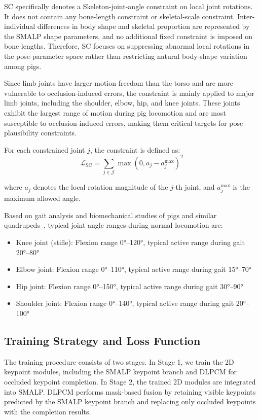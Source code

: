 \documentclass[runningheads]{llncs}
\begin{document}
SC specifically denotes a Skeleton-joint-angle constraint on local joint rotations. It does not contain any bone-length constraint or skeletal-scale constraint. Inter-individual differences in body shape and skeletal proportion are represented by the SMALP shape parameters, and no additional fixed constraint is imposed on bone lengths. Therefore, SC focuses on suppressing abnormal local rotations in the pose-parameter space rather than restricting natural body-shape variation among pigs.

Since limb joints have larger motion freedom than the torso and are more vulnerable to occlusion-induced errors, the constraint is mainly applied to major limb joints, including the shoulder, elbow, hip, and knee joints. These joints exhibit the largest range of motion during pig locomotion and are most susceptible to occlusion-induced errors, making them critical targets for pose plausibility constraints.

For each constrained joint $j$, the constraint is defined as:
\begin{equation}
\mathcal{L}_{\text{SC}} = \sum_{j \in \mathcal{J}} \max(0, a_j - a_j^{\max})^2
\label{eq:sc_loss}
\end{equation}

where $a_j$ denotes the local rotation magnitude of the $j$-th joint, and $a_j^{\max}$ is the maximum allowed angle.

Based on gait analysis and biomechanical studies of pigs and similar quadrupeds~\cite{ref29,ref30,ref31}, typical joint angle ranges during normal locomotion are:

\begin{itemize}
\item Knee joint (stifle): Flexion range 0°--120°, typical active range during gait 20°--80°
\item Elbow joint: Flexion range 0°--110°, typical active range during gait 15°--70°
\item Hip joint: Flexion range 0°--150°, typical active range during gait 30°--90°
\item Shoulder joint: Flexion range 0°--140°, typical active range during gait 20°--100°
\end{itemize}

\subsection{Training Strategy and Loss Function}
\label{subsec:training}

The training procedure consists of two stages. In Stage 1, we train the 2D keypoint modules, including the SMALP keypoint branch and DLPCM for occluded keypoint completion. In Stage 2, the trained 2D modules are integrated into SMALP. DLPCM performs mask-based fusion by retaining visible keypoints predicted by the SMALP keypoint branch and replacing only occluded keypoints with the completion results.
\end{document}
